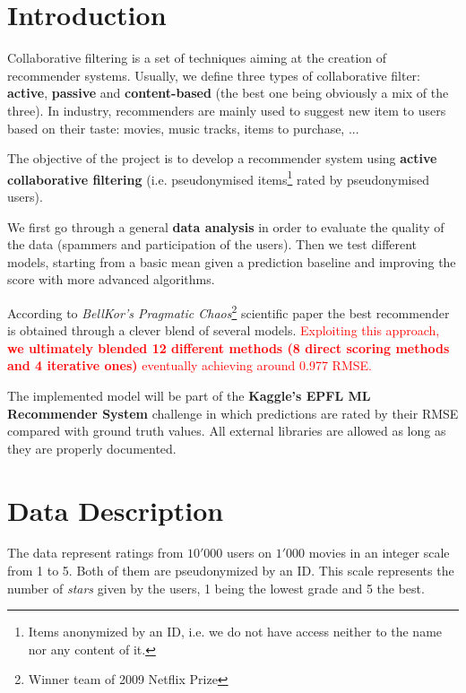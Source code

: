 \documentclass[10pt,conference,compsocconf]{IEEEtran}
\begin{document}
\section{Introduction}

Collaborative filtering is a set of techniques aiming at the creation of recommender systems. Usually, we define three types of collaborative filter: \textbf{active}, \textbf{passive} and \textbf{content-based} (the best one being obviously a mix of the three). In industry, recommenders are mainly used to suggest new item to users based on their taste: movies, music tracks, items to purchase, ...

The objective of the project is to develop a recommender system using \textbf{active collaborative filtering} (i.e. pseudonymised items\footnote{Items anonymized by an ID, i.e. we do not have access neither to the name nor any content of it.} rated by pseudonymised users).

We first go through a general \textbf{data analysis} in order to evaluate the quality of the data (spammers and participation of the users). Then we test different models, starting from a basic mean given a prediction baseline and improving the score with more advanced algorithms.

According to \textit{BellKor's Pragmatic Chaos}\footnote{Winner team of 2009 Netflix Prize} scientific paper \cite{BellKore_netflix} the best recommender is obtained through a clever blend of several models. \textcolor{red}{Exploiting this approach, \textbf{we ultimately blended 12 different methods (8 direct scoring methods and 4 iterative ones)} eventually achieving around 0.977 RMSE.}

The implemented model will be part of the \textbf{Kaggle's EPFL ML Recommender System} challenge in which predictions are rated by their RMSE compared with ground truth values. All external libraries are allowed as long as they are properly documented.

\section{Data Description}

The data represent ratings from $10'000$ users on $1'000$ movies in an integer scale from 1 to 5. Both of them are pseudonymized by an ID. This scale represents the number of \textit{stars} given by the users, 1 being the lowest grade and 5 the best.
\end{document}
